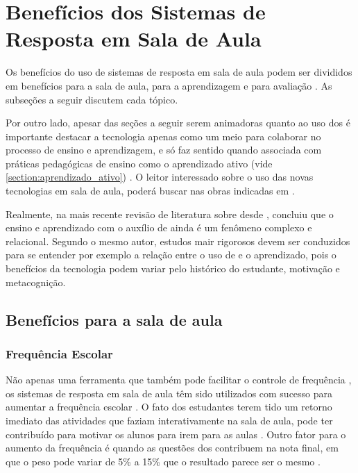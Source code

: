 \section{Benefícios dos Sistemas de Resposta em Sala de Aula}
Os benefícios do uso de sistemas de resposta em sala de aula podem ser divididos
em benefícios para a sala de aula, para a aprendizagem e para avaliação \cite{Kay2009}. As
subseções a seguir discutem cada tópico.


Por outro lado, apesar das seções a seguir serem animadoras quanto ao uso dos
{\clickers} é importante destacar a tecnologia apenas como um meio para
colaborar no processo de ensino e aprendizagem, e só faz sentido quando associada
com práticas pedagógicas de ensino como o aprendizado ativo
(vide \autoref{section:aprendizado_ativo}) \cite{Terrion2012, Moran2006}. O leitor interessado
sobre o uso das novas tecnologias em sala de aula, poderá buscar nas obras
indicadas em \cite{portalBrasil2014}.

Realmente, na mais recente revisão de literatura sobre {\clickers} desde \cite{Kay2009},
 concluiu que o ensino e aprendizado com o auxílio de {\clickers}
ainda é um fenômeno complexo e relacional. Segundo o mesmo autor, estudos mair rigorosos
devem ser conduzidos para se entender por exemplo a relação entre o uso de {\clickers}
e o aprendizado, pois o benefícios da tecnologia podem variar pelo histórico do
estudante, motivação e metacognição.

\subsection{Benefícios para a sala de aula}

\subsubsection{Frequência Escolar}
Não apenas uma ferramenta que também pode facilitar o controle de frequência
\cite{Strasser2010},
os sistemas de resposta em sala de aula têm sido utilizados com sucesso para aumentar
a frequência escolar \cite{Fotaris2016, Velasco2013, Puente2012, Mayer2009, Caldwell2007}. O fato dos
estudantes terem tido um retorno imediato das atividades que faziam interativamente
na sala de aula, pode ter contribuído para motivar os alunos para irem para as aulas \cite{Puente2012}.
Outro fator para o aumento da frequência é quando as questões dos {\clickers} contribuem na nota final,
em que o peso pode variar de 5\% a 15\% que o resultado parece ser o mesmo \cite{Caldwell2007}.

